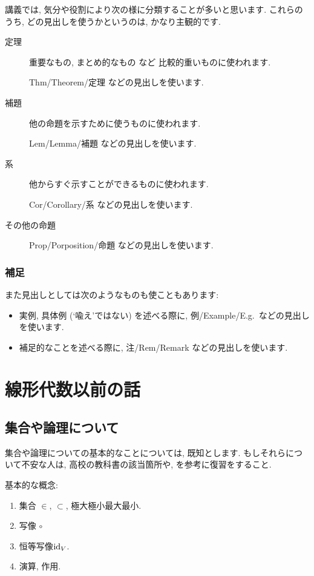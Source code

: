 講義では, 
気分や役割により次の様に分類することが多いと思います.
これらのうち, どの見出しを使うかというのは, 
かなり主観的です.
\begin{description}
\item[定理]
重要なもの, まとめ的なもの など 比較的重いものに使われます.

Thm/Theorem/定理  などの見出しを使います.

\item[補題]
他の命題を示すために使うものに使われます.

Lem/Lemma/補題  などの見出しを使います.

\item[系]
他からすぐ示すことができるものに使われます.

Cor/Corollary/系  などの見出しを使います.
\item[その他の命題]

Prop/Porposition/命題  などの見出しを使います.
\end{description}

\subsection{補足}
また見出しとしては次のようなものも使こともあります:
\begin{itemize}
 \item 
実例, 具体例 (`喩え'ではない) を述べる際に,
例/Example/E.g.\   などの見出しを使います.
\item
補足的なことを述べる際に,
注/Rem/Remark   などの見出しを使います.
\end{itemize}

\tableofcontents


\renewcommand{\thesection}{\originalthesection}
\mainmatter

\chapter{線形代数以前の話}


\section{集合や論理について}

集合や論理についての基本的なことについては,
既知とします.
もしそれらについて不安な人は,
高校の教科書の該当箇所や,
\cite{978-4-535-78682-0}
を参考に復習をすること.

基本的な概念:
\begin{enumerate}
  \item 集合 $\in$, $\subset$, 極大極小最大最小.
  \item 写像 $\circ$
  \item 恒等写像$\operatorname{id}_V$.
  \item 演算, 作用.
\end{enumerate}


